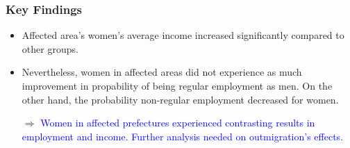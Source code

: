 \documentclass[serif, aspectratio=169]{beamer}
\begin{document}

\begin{frame}[label=summary]
\frametitle{Key Findings}





{\Large
\begin{itemize} 

\item Affected area's women's average income increased significantly compared to other groups.

\item Nevertheless, women in affected areas did not experience as much improvement in propability of being regular employment as men. On the other hand, the probability non-regular employment decreased for women.

\vspace{0.2cm}

$\Rightarrow$ \textcolor{blue}{Women in affected prefectures experienced contrasting results in employment and income. Further analysis needed on outmigration's effects.} 
\end{itemize}

}
\end{frame}

\end{document}
